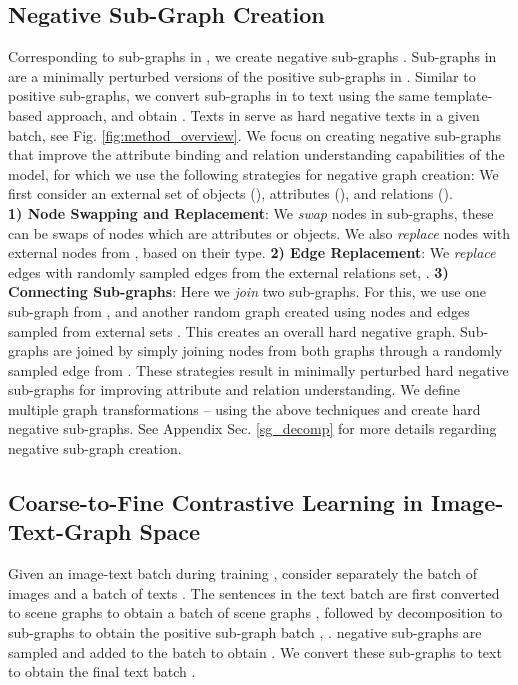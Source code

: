 \documentclass[11pt]{article}
\begin{document}
\subsection{Negative Sub-Graph Creation}
\label{subsec_neg_graph_creation}
Corresponding to sub-graphs in , we create negative sub-graphs . Sub-graphs in  are a minimally perturbed versions of the positive sub-graphs in . Similar to positive sub-graphs, we convert sub-graphs in  to text using the same template-based approach, and obtain . Texts in  serve as hard negative texts in a given batch, see Fig. \ref{fig:method_overview}. We focus on creating negative sub-graphs that improve the attribute binding and relation understanding capabilities of the model, for which we use the following strategies for negative graph creation:
We first consider an external set of objects (), attributes (), and relations (). \\
\textbf{1) Node Swapping and Replacement}: We \textit{swap} nodes in sub-graphs, these can be swaps of nodes which are attributes or objects. We also \textit{replace} nodes with external nodes from ,  based on their type. \textbf{2) Edge Replacement}: We \textit{replace} edges with randomly sampled edges from the external relations set, . \textbf{3) Connecting Sub-graphs}: Here we \textit{join} two sub-graphs. For this, we use one sub-graph from , and another random graph created using nodes and edges sampled from external sets . This creates an overall hard negative graph. Sub-graphs are joined by simply joining nodes from both graphs through a randomly sampled edge from . 
These strategies result in minimally perturbed hard negative sub-graphs for improving attribute and relation understanding. We define multiple graph transformations  --  using the above techniques and create hard negative sub-graphs. See Appendix Sec. \ref{sg_decomp} for more details regarding negative sub-graph creation.


\subsection{Coarse-to-Fine Contrastive Learning in Image-Text-Graph Space}
\label{subsec_coarsetofine_loss}
Given an image-text batch during training , consider separately the batch of images  and a batch of texts .
The sentences in the text batch are first converted to scene graphs to obtain a batch of scene graphs , followed by decomposition to sub-graphs to obtain the positive sub-graph batch , .  negative sub-graphs are sampled and added to the batch to obtain .
We convert these sub-graphs to text to obtain the final text batch .
\end{document}
